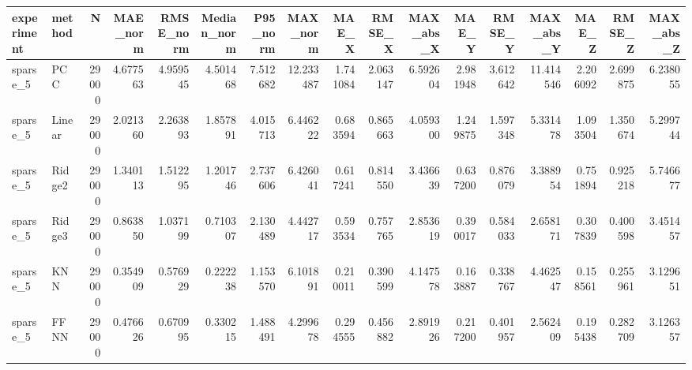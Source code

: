 \begin{tabular}{llrrrrrrrrrrrrrrr}
\toprule
experiment & method & N & MAE_norm & RMSE_norm & Median_norm & P95_norm & MAX_norm & MAE_X & RMSE_X & MAX_abs_X & MAE_Y & RMSE_Y & MAX_abs_Y & MAE_Z & RMSE_Z & MAX_abs_Z \\
\midrule
sparse_5 & PCC & 29000 & 4.677563 & 4.959545 & 4.501468 & 7.512682 & 12.233487 & 1.741084 & 2.063147 & 6.592604 & 2.981948 & 3.612642 & 11.414546 & 2.206092 & 2.699875 & 6.238055 \\
sparse_5 & Linear & 29000 & 2.021360 & 2.263893 & 1.857891 & 4.015713 & 6.446222 & 0.683594 & 0.865663 & 4.059300 & 1.249875 & 1.597348 & 5.331478 & 1.093504 & 1.350674 & 5.299744 \\
sparse_5 & Ridge2 & 29000 & 1.340113 & 1.512295 & 1.201746 & 2.737606 & 6.426041 & 0.617241 & 0.814550 & 3.436639 & 0.637200 & 0.876079 & 3.388954 & 0.751894 & 0.925218 & 5.746677 \\
sparse_5 & Ridge3 & 29000 & 0.863850 & 1.037199 & 0.710307 & 2.130489 & 4.442717 & 0.593534 & 0.757765 & 2.853619 & 0.390017 & 0.584033 & 2.658171 & 0.307839 & 0.400598 & 3.451457 \\
sparse_5 & KNN & 29000 & 0.354909 & 0.576929 & 0.222238 & 1.153570 & 6.101891 & 0.210011 & 0.390599 & 4.147578 & 0.163887 & 0.338767 & 4.462547 & 0.158561 & 0.255961 & 3.129651 \\
sparse_5 & FFNN & 29000 & 0.476626 & 0.670995 & 0.330215 & 1.488491 & 4.299678 & 0.294555 & 0.456882 & 2.891926 & 0.217200 & 0.401957 & 2.562409 & 0.195438 & 0.282709 & 3.126357 \\
\bottomrule
\end{tabular}
